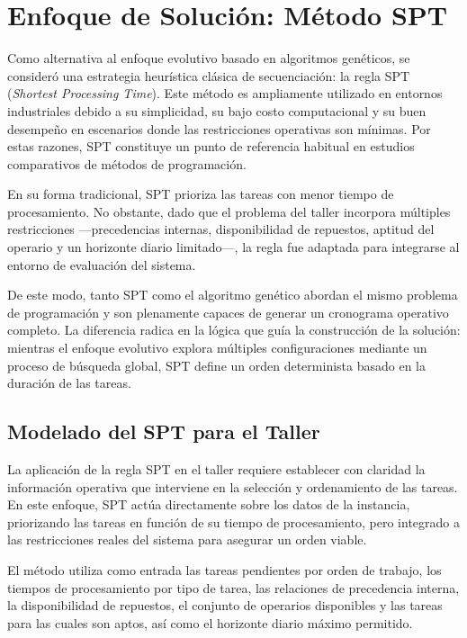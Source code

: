 \section{Enfoque de Solución: Método SPT}

Como alternativa al enfoque evolutivo basado en algoritmos genéticos, se consideró una 
estrategia heurística clásica de secuenciación: la regla SPT (\textit{Shortest Processing 
Time}). Este método es ampliamente utilizado en entornos industriales debido a su 
simplicidad, su bajo costo computacional y su buen desempeño en escenarios donde las 
restricciones operativas son mínimas. Por estas razones, SPT constituye un punto de 
referencia habitual en estudios comparativos de métodos de programación.

En su forma tradicional, SPT prioriza las tareas con menor tiempo de procesamiento. No 
obstante, dado que el problema del taller incorpora múltiples restricciones —precedencias 
internas, disponibilidad de repuestos, aptitud del operario y un horizonte diario limitado—, 
la regla fue adaptada para integrarse al entorno de evaluación del sistema. 

De este modo, tanto SPT como el algoritmo genético abordan el mismo problema de 
programación y son plenamente capaces de generar un cronograma operativo completo. 
La diferencia radica en la lógica que guía la construcción de la solución: mientras el 
enfoque evolutivo explora múltiples configuraciones mediante un proceso de búsqueda global, 
SPT define un orden determinista basado en la duración de las tareas.

\subsection{Modelado del SPT para el Taller}

La aplicación de la regla SPT en el taller requiere establecer con claridad la información 
operativa que interviene en la selección y ordenamiento de las tareas. En este enfoque, SPT 
actúa directamente sobre los datos de la instancia, priorizando las tareas en función de su 
tiempo de procesamiento, pero integrado a las restricciones reales del sistema para asegurar 
un orden viable.

El método utiliza como entrada las tareas pendientes por orden de trabajo, los tiempos de 
procesamiento por tipo de tarea, las relaciones de precedencia interna, la disponibilidad de 
repuestos, el conjunto de operarios disponibles y las tareas para las cuales son aptos, así 
como el horizonte diario máximo permitido.

